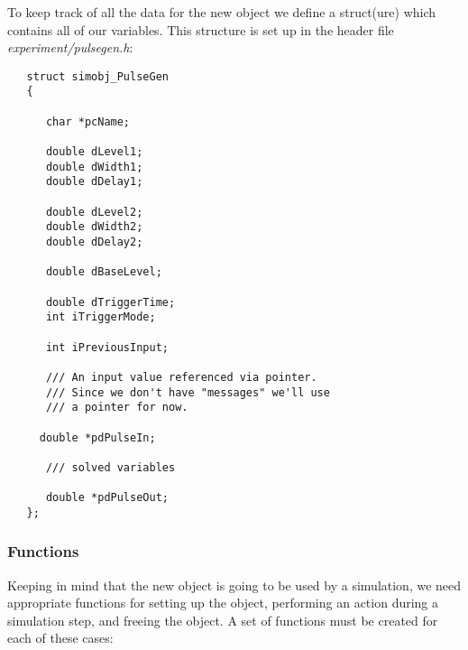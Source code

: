 \documentclass[12pt]{article}
\begin{document}
To keep track of all the data for the new object we define a struct(ure) which contains all of our variables. This structure is set up in the header file {\it experiment/pulsegen.h}:
\begin{verbatim}
   struct simobj_PulseGen
   {
   
      char *pcName;

      double dLevel1;
      double dWidth1;
      double dDelay1;

      double dLevel2;
      double dWidth2;
      double dDelay2;

      double dBaseLevel;

      double dTriggerTime;
      int iTriggerMode;
  
      int iPreviousInput;

      /// An input value referenced via pointer. 
      /// Since we don't have "messages" we'll use 
      /// a pointer for now.
  
     double *pdPulseIn;

      /// solved variables

      double *pdPulseOut;
   };
\end{verbatim}

\subsubsection*{Functions}

Keeping in mind that the new object is going to be used by a simulation, we need appropriate functions for setting up the object, performing an action during a simulation step, and freeing the object. A set of functions must be created for each of these cases:
\end{document}
